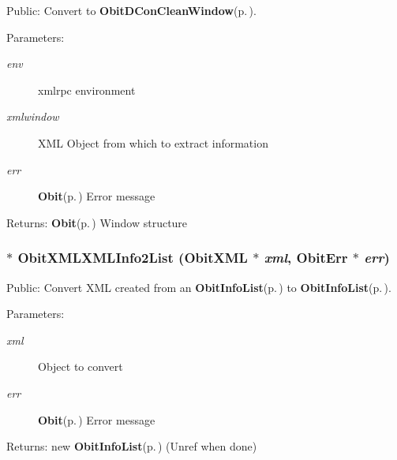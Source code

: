 Public: Convert to {\bf Obit\-DCon\-Clean\-Window}{\rm (p.\,\pageref{structObitDConCleanWindow})}. 

\begin{Desc}
\item[Parameters:]
\begin{description}
\item[{\em env}]xmlrpc environment \item[{\em xmlwindow}]XML Object from which to extract information \item[{\em err}]{\bf Obit}{\rm (p.\,\pageref{structObit})} Error message \end{description}
\end{Desc}
\begin{Desc}
\item[Returns:]{\bf Obit}{\rm (p.\,\pageref{structObit})} Window structure \end{Desc}
\subsubsection{$\ast$ Obit\-XMLXMLInfo2List ({\bf Obit\-XML} $\ast$ {\em xml}, {\bf Obit\-Err} $\ast$ {\em err})}\label{ObitXML_8c_a18}


Public: Convert XML created from an {\bf Obit\-Info\-List}{\rm (p.\,\pageref{structObitInfoList})} to {\bf Obit\-Info\-List}{\rm (p.\,\pageref{structObitInfoList})}. 

\begin{Desc}
\item[Parameters:]
\begin{description}
\item[{\em xml}]Object to convert \item[{\em err}]{\bf Obit}{\rm (p.\,\pageref{structObit})} Error message \end{description}
\end{Desc}
\begin{Desc}
\item[Returns:]new {\bf Obit\-Info\-List}{\rm (p.\,\pageref{structObitInfoList})} (Unref when done) \end{Desc}

